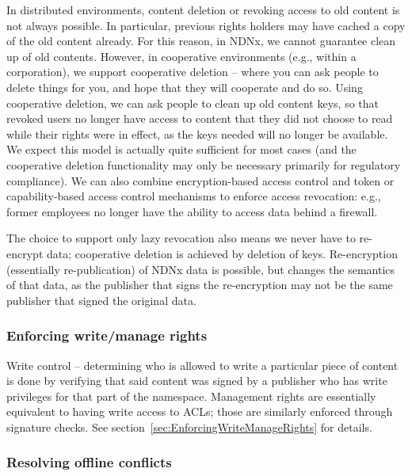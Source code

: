 In distributed environments, content deletion or revoking access to
old content is not always possible. In particular, previous rights
holders may have cached a copy of the old content already. For this
reason, in NDNx, we cannot guarantee clean up of old
contents. However, in cooperative environments (e.g., within a
corporation), we support cooperative deletion -- where you can ask
people to delete things for you, and hope that they will cooperate and
do so. Using cooperative deletion, we can ask people to clean up old
content keys, so that revoked users no longer have access to content
that they did not choose to read while their rights were in effect, as
the keys needed will no longer be available. We expect this model is
actually quite sufficient for most cases (and the cooperative deletion
functionality may only be necessary primarily for regulatory
compliance). We can also combine encryption-based access control and
token or capability-based access control mechanisms to enforce access
revocation: e.g., former employees no longer have the ability to
access data behind a firewall.

The choice to support only lazy revocation also means we never have to
re-encrypt data; cooperative deletion is achieved by deletion of
keys. Re-encryption (essentially re-publication) of NDNx data is
possible, but changes the semantics of that data, as the publisher
that signs the re-encryption may not be the same publisher that signed
the original data.

\subsubsection{Enforcing write/manage rights}

Write control -- determining who is allowed to write a particular
piece of content is done by verifying that said content was signed by
a publisher who has write privileges for that part of the
namespace. Management rights are essentially equivalent to having
write access to ACLs; those are similarly enforced through signature
checks. See section~\ref{sec:EnforcingWriteManageRights} for details.

\subsubsection{Resolving offline conflicts}

